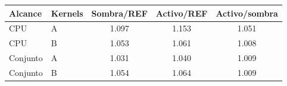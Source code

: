 \begin{tabular}{@{}llccc@{}}
\toprule
\textbf{Alcance} & \textbf{Kernels} & \textbf{Sombra/REF} & \textbf{Activo/REF} & \textbf{Activo/sombra} \\
\midrule
CPU & A & 1.097 & 1.153 & 1.051 \\
CPU & B & 1.053 & 1.061 & 1.008 \\
Conjunto & A & 1.031 & 1.040 & 1.009 \\
Conjunto & B & 1.054 & 1.064 & 1.009 \\
\bottomrule
\end{tabular}
